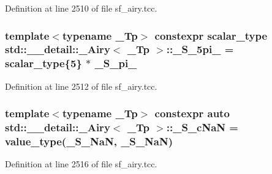 Definition at line 2510 of file sf\+\_\+airy.\+tcc.

\subsubsection[{\texorpdfstring{\+\_\+\+S\+\_\+5pi\+\_\+6}{_S_5pi_6}}]{\setlength{\rightskip}{0pt plus 5cm}template$<$typename \+\_\+\+Tp$>$ constexpr {\bf scalar\+\_\+type} {\bf std\+::\+\_\+\+\_\+detail\+::\+\_\+\+Airy}$<$ \+\_\+\+Tp $>$\+::\+\_\+\+S\+\_\+5pi\+\_ = {\bf scalar\+\_\+type}\{5\} $\ast$ {\bf \+\_\+\+S\+\_\+pi\+\_}\hspace{0.3cm}{\ttfamily [static]}}\hypertarget{classstd_1_1____detail_1_1__Airy_a81972f7ec24b2d67c7bf928450a9589c}{}\label{classstd_1_1____detail_1_1__Airy_a81972f7ec24b2d67c7bf928450a9589c}


Definition at line 2512 of file sf\+\_\+airy.\+tcc.

\subsubsection[{\texorpdfstring{\+\_\+\+S\+\_\+c\+NaN}{_S_cNaN}}]{\setlength{\rightskip}{0pt plus 5cm}template$<$typename \+\_\+\+Tp$>$ constexpr auto {\bf std\+::\+\_\+\+\_\+detail\+::\+\_\+\+Airy}$<$ \+\_\+\+Tp $>$\+::\+\_\+\+S\+\_\+c\+NaN = {\bf value\+\_\+type}({\bf \+\_\+\+S\+\_\+\+NaN}, {\bf \+\_\+\+S\+\_\+\+NaN})\hspace{0.3cm}{\ttfamily [static]}}\hypertarget{classstd_1_1____detail_1_1__Airy_aee4964dc3e741181641483c6befa7338}{}\label{classstd_1_1____detail_1_1__Airy_aee4964dc3e741181641483c6befa7338}


Definition at line 2516 of file sf\+\_\+airy.\+tcc.

